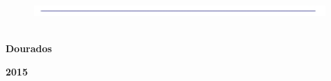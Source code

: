 \begin{center}
\vspace{1cm}

\begin{figure}[h]
\centering
\includegraphics[width=15.0cm, height=0.40cm]{imagens/AZUL.jpg}\
\end{figure}

\textbf{Dourados}

\vspace{-0,5cm} %

\textbf{2015}

\end{center}%
